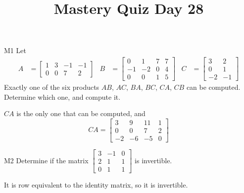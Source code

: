 \documentclass{sbgLAquiz}
\title{Mastery Quiz Day 28 }
\begin{document}
\begin{problem}{M1}
Let 
\begin{align*}
A &= \begin{bmatrix} 1 & 3 & -1 & -1 \\ 0 & 0 & 7 & 2 \end{bmatrix} & B &= \begin{bmatrix} 0 & 1 & 7 & 7 \\ -1 & -2 & 0 & 4 \\ 0 & 0 & 1 & 5 \end{bmatrix} & C&=\begin{bmatrix} 3 & 2 \\ 0 & 1 \\ -2 & -1 \end{bmatrix}
\end{align*}
Exactly one of the six products $AB$, $AC$, $BA$, $BC$, $CA$, $CB$ can be computed.  Determine which one, and compute it.
\end{problem}
\begin{solution}
$CA$ is the only one that can be computed, and 
$$CA = \begin{bmatrix} 3 & 9 & 11 & 1 \\ 0 & 0 & 7 & 2 \\ -2 & - 6 & -5 & 0 \end{bmatrix}$$
\end{solution}

\begin{problem}{M2}
Determine if the matrix $\begin{bmatrix} 3 & -1 & 0  \\ 2 & 1 & 1  \\ 0 & 1 & 1   \end{bmatrix}$ is invertible.
\end{problem}
\begin{solution}
It is row equivalent to the identity matrix, so it is invertible.
\end{solution}
\end{document}
